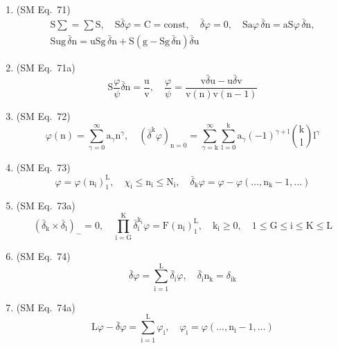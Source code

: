 \documentclass[12pt]{article}
\begin{document}
\begin{enumerate}[label=(\arabic*), series=formellist]
    \item (SM Eq.\ 71) 
    \[
    \begin{gathered}
    \mathrm{S}\sum = \sum\mathrm{S}, \quad \mathrm{S}\bar{\delta}\varphi = \mathrm{C} = \mathrm{const}, \quad \bar{\delta}\varphi = 0, \quad \mathrm{S}\mathrm{a}\varphi\,\bar{\delta}\mathrm{n} = \mathrm{a}\mathrm{S}\varphi\,\bar{\delta}\mathrm{n}, \\
    \mathrm{S}\mathrm{ug}\,\bar{\delta}\mathrm{n} = \mathrm{u}\mathrm{S}\mathrm{g}\,\bar{\delta}\mathrm{n} + \mathrm{S}(\mathrm{g} - \mathrm{S}\mathrm{g}\,\bar{\delta}\mathrm{n})\bar{\delta}\mathrm{u}
    \end{gathered}
    \]

    \item (SM Eq.\ 71a) 
    \[
    \mathrm{S}\frac{\varphi}{\psi}\bar{\delta}\mathrm{n} = \frac{\mathrm{u}}{\mathrm{v}}, \quad \frac{\varphi}{\psi} = \frac{\mathrm{v}\bar{\delta}\mathrm{u} - \mathrm{u}\bar{\delta}\mathrm{v}}{\mathrm{v}(\mathrm{n})\mathrm{v}(\mathrm{n}-1)}
    \]

    \item (SM Eq.\ 72) 
    \[
    \varphi(\mathrm{n}) = \sum_{\gamma=0}^\infty \mathrm{a}_\gamma \mathrm{n}^\gamma, \quad (\bar{\delta}^\mathrm{k} \varphi)_{\mathrm{n}=0} = \sum_{\gamma=\mathrm{k}}^\infty \sum_{\mathrm{l}=0}^\mathrm{k} \mathrm{a}_\gamma (-1)^{\gamma+\mathrm{l}} \binom{\mathrm{k}}{\mathrm{l}} \mathrm{l}^\gamma
    \]

    \item (SM Eq.\ 73) 
    \[
    \varphi = \varphi(\mathrm{n_i})_1^\mathrm{L}, \quad \chi_\mathrm{i} \le \mathrm{n_i} \le \mathrm{N_i}, \quad \bar{\delta}_\mathrm{k} \varphi = \varphi - \varphi(\dots, \mathrm{n_k} - 1, \dots)
    \]

    \item (SM Eq.\ 73a) 
    \[
    (\bar{\delta}_\mathrm{k} \times \bar{\delta}_\mathrm{l})_- = 0, \quad \prod_{\mathrm{i}=\mathrm{G}}^{\mathrm{K}} \bar{\delta}_\mathrm{i}^{\mathrm{k_i}} \varphi = \mathrm{F}(\mathrm{n_i})_1^\mathrm{L}, \quad \mathrm{k_i} \ge 0, \quad 1 \le \mathrm{G} \le \mathrm{i} \le \mathrm{K} \le \mathrm{L}
    \]

    \item (SM Eq.\ 74) 
    \[
    \bar{\delta}\varphi = \sum_{\mathrm{i}=1}^\mathrm{L} \bar{\delta}_\mathrm{i} \varphi, \quad \bar{\delta}_\mathrm{i} \mathrm{n_k} = \delta_{\mathrm{ik}}
    \]

    \item (SM Eq.\ 74a) 
    \[
    \mathrm{L}\varphi - \bar{\delta}\varphi = \sum_{\mathrm{i}=1}^\mathrm{L} \varphi_\mathrm{i}, \quad \varphi_\mathrm{i} = \varphi(\dots, \mathrm{n_i} - 1, \dots)
    \]


\end{enumerate}
\end{document}
